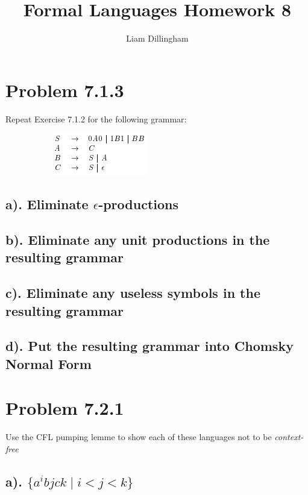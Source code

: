 \documentclass[20pt]{article} %
\title{Formal Languages Homework 8}
\author{Liam Dillingham}
\begin{document}
\maketitle

\section{Problem 7.1.3}
Repeat Exercise 7.1.2 for the following grammar:
\begin{figure}[!htbp]
  	\centering
   	\begin{subfigure}[p]{0.3\linewidth}
    	\includegraphics[width=\linewidth]{./figures/HW7fig1.png}
   	\end{subfigure}
\end{figure} 
\subsection{a). Eliminate $\epsilon$-productions}
\subsection{b). Eliminate any unit productions in the resulting grammar}
\subsection{c). Eliminate any useless symbols in the resulting grammar}
\subsection{d). Put the resulting grammar into Chomsky Normal Form}
\section{Problem 7.2.1}
Use the CFL pumping lemme to show each of these languages not to be \textit{context-free}
\subsection{a). $\{ a^{i} b{j} c{k} \mid i < j < k \}$}
\end{document}
